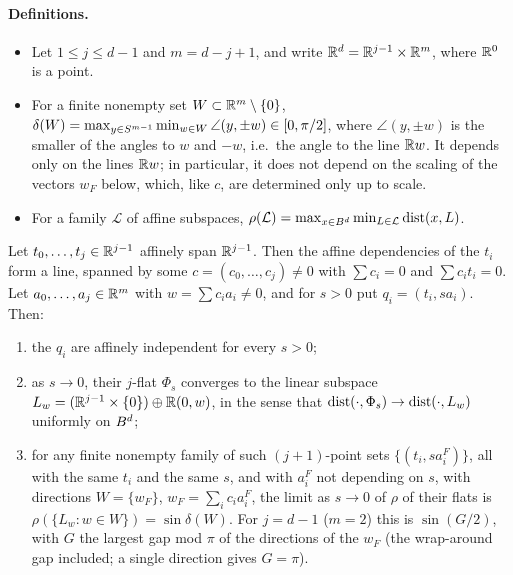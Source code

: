 \documentclass[11pt]{article}
\begin{document}
\paragraph{Definitions.}
\begin{itemize}
  \item Let $1 \le j \le d-1$ and $m = d-j+1$, and write $\mathbb{R}^d = \mathbb{R}^{j-1} \times \mathbb{R}^m$, where $\mathbb{R}^0$ is a
    point.
  \item For a finite nonempty set $W \subset \mathbb{R}^m \setminus \{0\}$,
    $\delta(W) = \max_{y \in S^{m-1}} \min_{w \in W} \angle(y, \pm w) \in [0, \pi/2]$, where
    $\angle(y, \pm w)$ is the smaller of the angles to $w$ and $-w$, i.e.\ the angle to the line
    $\mathbb{R} w$. It depends only on the lines $\mathbb{R} w$; in particular, it does not depend on the
    scaling of the vectors $w_F$ below, which, like $c$, are determined only up to scale.
  \item For a family $\mathcal{L}$ of affine subspaces,
    $\rho(\mathcal{L}) = \max_{x \in B^d} \min_{L \in \mathcal{L}} \operatorname{dist}(x, L)$.
\end{itemize}

\begin{lemma}\label{lem:B-lemma2-flats}
Let $t_0, \dots, t_j \in \mathbb{R}^{j-1}$ affinely span $\mathbb{R}^{j-1}$. Then the affine dependencies of the
$t_i$ form a line, spanned by some $c = (c_0, \dots, c_j) \ne 0$ with $\sum c_i = 0$ and
$\sum c_i t_i = 0$. Let $a_0, \dots, a_j \in \mathbb{R}^m$ with $w = \sum c_i a_i \ne 0$, and for $s > 0$
put $q_i = (t_i, s a_i)$. Then:
\begin{enumerate}[label=(\roman*)]
  \item the $q_i$ are affinely independent for every $s > 0$;
  \item as $s \to 0$, their $j$-flat $\Phi_s$ converges to the linear subspace
    $L_w = (\mathbb{R}^{j-1} \times \{0\}) \oplus \mathbb{R}(0, w)$, in the sense that
    $\operatorname{dist}(\cdot, \Phi_s) \to \operatorname{dist}(\cdot, L_w)$ uniformly on $B^d$;
  \item for any finite nonempty family of such $(j+1)$-point sets $\{(t_i, s a_i^F)\}$, all with the same $t_i$ and the
    same $s$, and with $a_i^F$ not depending on $s$, with directions $W = \{w_F\}$, $w_F = \sum_i c_i a_i^F$, the limit as $s \to 0$ of $\rho$ of their flats is
    $\rho(\{L_w : w \in W\}) = \sin \delta(W)$. For $j = d-1$ ($m = 2$) this is $\sin(G/2)$, with
    $G$ the largest gap mod $\pi$ of the directions of the $w_F$ (the wrap-around gap included; a
    single direction gives $G = \pi$).
\end{enumerate}
\end{lemma}
\end{document}
